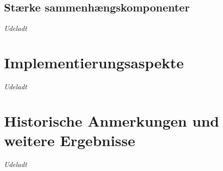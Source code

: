 \subsection{Stærke sammenhængskomponenter}
%

\emph{Udeladt}

\section{Implementierungsaspekte}

\emph{Udeladt}

\section{Historische Anmerkungen und weitere Ergebnisse}


\emph{Udeladt}

